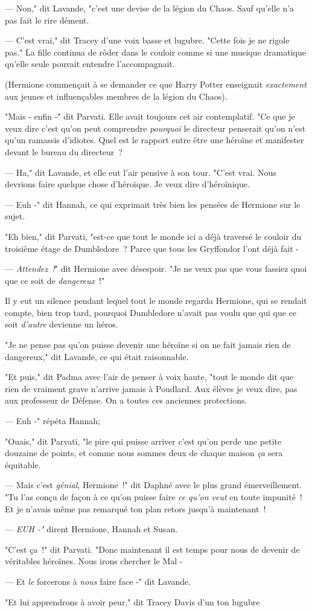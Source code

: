 --- Non," dit Lavande, "c'est une devise de la légion du Chaos. Sauf qu'elle n'a pas fait le rire dément.

--- C'est vrai," dit Tracey d'une voix basse et lugubre. "Cette fois je ne rigole pas." La fille continua de rôder dans le couloir comme si une musique dramatique qu'elle seule pouvait entendre l'accompagnait.

(Hermione commençait à se demander ce que Harry Potter enseignait \emph{exactement} aux jeunes et influençables membres de la légion du Chaos).

"Mais - enfin -" dit Parvati. Elle avait toujours cet air contemplatif. "Ce que je veux dire c'est qu'on peut comprendre \emph{pourquoi} le directeur penserait qu'on n'est qu'un ramassis d'idiotes. Quel est le rapport entre être une héroïne et manifester devant le bureau du directeur~?

--- Ha," dit Lavande, et elle eut l'air pensive à son tour. "C'est vrai. Nous devrions faire quelque chose d'héroïque. Je veux dire d'héroïnique.

--- Euh -" dit Hannah, ce qui exprimait très bien les pensées de Hermione sur le sujet.

"Eh bien," dit Parvati, "est-ce que tout le monde ici a déjà traversé le couloir du troisième étage de Dumbledore~? Parce que tous les Gryffondor l'ont déjà fait -

--- \emph{Attendez~!}" dit Hermione avec désespoir. "Je ne veux pas que vous fassiez quoi que ce soit de \emph{dangereux}~!"

Il y eut un silence pendant lequel tout le monde regarda Hermione, qui se rendait compte, bien trop tard, pourquoi Dumbledore n'avait pas voulu que qui que ce soit \emph{d'autre} devienne un héros.

"Je ne pense pas qu'on puisse devenir une héroïne si on ne fait jamais rien de dangereux," dit Lavande, ce qui était raisonnable.

"Et puis," dit Padma avec l'air de penser à voix haute, "tout le monde dit que rien de vraiment grave n'arrive jamais à Poudlard. Aux élèves je veux dire, pas aux professeur de Défense. On a toutes ces anciennes protections.

--- Euh -" répéta Hannah;

"Ouais," dit Parvati, "le pire qui puisse arriver c'est qu'on perde une petite douzaine de points, et comme nous sommes deux de chaque maison \emph{ça} sera équitable.

--- Mais c'est \emph{génial}, Hermione~!" dit Daphné avec le plus grand émerveillement. "Tu l'as conçu de façon à ce qu'on puisse faire \emph{ce qu'on veut} en toute impunité~! Et je n'avais même pas remarqué ton plan retors jusqu'à maintenant~!

--- \emph{EUH -"} dirent Hermione, Hannah et Susan.

"C'est ça~!" dit Parvati. "Donc maintenant il est temps pour nous de devenir de véritables héroïnes. Nous irons chercher le Mal -

--- Et \emph{le} forcerons à \emph{nous} faire face -" dit Lavande.

"Et lui apprendrons à avoir peur," dit Tracey Davis d'un ton lugubre 

